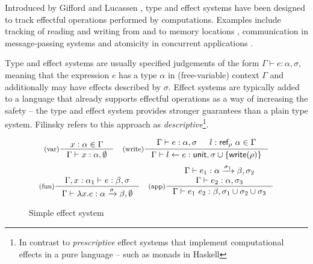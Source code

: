 Introduced by Gifford and Lucassen \cite{effects-gifford,effects-polymorphic}, type and effect 
systems have been designed to track effectful operations performed by computations. Examples 
include tracking of reading and writing from and to memory locations \cite{effects-talpin-et-al}, 
communication in message-passing systems \cite{effects-messagepassing} and atomicity in concurrent 
applications \cite{effects-atomicity}.

Type and effect systems are usually specified judgements of the form $\Gamma \vdash e : \alpha, \sigma$, 
meaning that the expression $e$ has a type $\alpha$ in (free-variable) context $\Gamma$ and 
additionally may have effects described by $\sigma$. Effect systems are typically added to a 
language that already supports effectful operations as a way of increasing the safety -- the type
and effect system provides stronger guarantees than a plain type system. Filinsky 
\cite{effects-comprehensive} refers to this approach as \emph{descriptive}\footnote{In contrast
to \emph{prescriptive} effect systems that implement computational effects in a pure language 
-- such as monads in Haskell}.


\begin{figure}[t]
\begin{equation*}
\inference[(var)]
  {x:\alpha \in \Gamma }
  {\Gamma \vdash x : \alpha, \emptyset }
\quad
\inference[(write)]
  {\Gamma \vdash e : \alpha, \sigma & l:\ident{ref}_\rho~\alpha\in \Gamma}
  {\Gamma \vdash l \leftarrow e : \ident{unit}, \sigma \cup \{\ident{write}(\rho)\} }
\end{equation*}
\begin{equation*}
\inference[(fun)]
  {\Gamma, x:\alpha_1 \vdash e : \beta, \sigma }
  {\Gamma \vdash \lambda x.e : \alpha \xrightarrow{\sigma} \beta, \emptyset }
\quad  
\inference[(app)]
  {\Gamma \vdash e_1 : \alpha \xrightarrow{\sigma_1} \beta, \sigma_2 \\
   \Gamma \vdash e_2 : \alpha, \sigma_3 }
  {\Gamma \vdash e_1~e_2 : \beta, \sigma_1 \cup \sigma_2 \cup \sigma_3 }
\end{equation*}

\caption{Simple effect system}
\label{fig:path-eff}
\end{figure}



